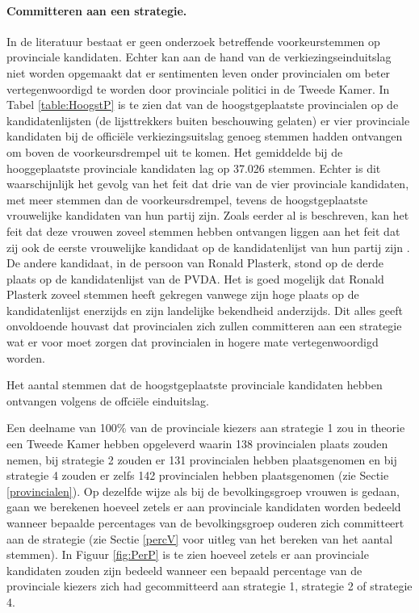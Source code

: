 \paragraph{Committeren aan een strategie.}
In de literatuur bestaat er geen onderzoek betreffende voorkeurstemmen op provinciale kandidaten. Echter kan aan de hand van de verkiezingseinduitslag niet worden opgemaakt dat er sentimenten leven onder provincialen om beter vertegenwoordigd te worden door provinciale politici in de Tweede Kamer. In Tabel \ref{table:HoogstP} is te zien dat van de hoogstgeplaatste provincialen op de kandidatenlijsten (de lijsttrekkers buiten beschouwing gelaten) er vier provinciale kandidaten bij de offici\"{e}le verkiezingsuitslag genoeg stemmen hadden ontvangen om boven de voorkeursdrempel uit te komen. Het gemiddelde bij de hooggeplaatste provinciale kandidaten lag op 37.026 stemmen. Echter is dit waarschijnlijk het gevolg van het feit dat drie van de vier provinciale kandidaten, met meer stemmen dan de voorkeursdrempel, tevens de hoogstgeplaatste vrouwelijke kandidaten van hun partij zijn. Zoals eerder al is beschreven, kan het feit dat deze vrouwen zoveel stemmen hebben ontvangen liggen aan het feit dat zij ook de eerste vrouwelijke kandidaat op de kandidatenlijst van hun partij zijn \citep{van2012tweede}. De andere kandidaat, in de persoon van Ronald Plasterk, stond op de derde plaats op de kandidatenlijst van de PVDA. Het is goed mogelijk dat Ronald Plasterk zoveel stemmen heeft gekregen vanwege zijn hoge plaats op de kandidatenlijst enerzijds en zijn landelijke bekendheid anderzijds. Dit alles geeft onvoldoende houvast dat provincialen zich zullen committeren aan een strategie wat er voor moet zorgen dat provincialen in hogere mate vertegenwoordigd worden. \\

\begin{table}[H]
\centering
	\begin{footnotesize}
		
	\end{footnotesize}
			\caption{Het aantal stemmen dat de hoogstgeplaatste provinciale kandidaten hebben ontvangen volgens de offci\"{e}le einduitslag.}
\label{table:HoogstP} 
\end{table}

\indent Een deelname van 100\% van de provinciale kiezers aan strategie 1 zou in theorie een Tweede Kamer hebben opgeleverd waarin 138 provincialen plaats zouden nemen, bij strategie 2 zouden er 131 provincialen hebben plaatsgenomen en bij strategie 4 zouden er zelfs 142 provincialen hebben plaatsgenomen  (zie Sectie \ref{provincialen}).  Op dezelfde wijze als bij de bevolkingsgroep vrouwen is gedaan, gaan we berekenen hoeveel zetels er aan provinciale kandidaten worden bedeeld wanneer bepaalde percentages van de bevolkingsgroep ouderen zich committeert aan de strategie (zie Sectie \ref{percV} voor uitleg van het bereken van het aantal stemmen). In Figuur \ref{fig:PerP} is te zien hoeveel zetels er aan provinciale kandidaten zouden zijn bedeeld wanneer een bepaald percentage van de provinciale kiezers zich had gecommitteerd aan strategie 1, strategie 2 of strategie 4.



